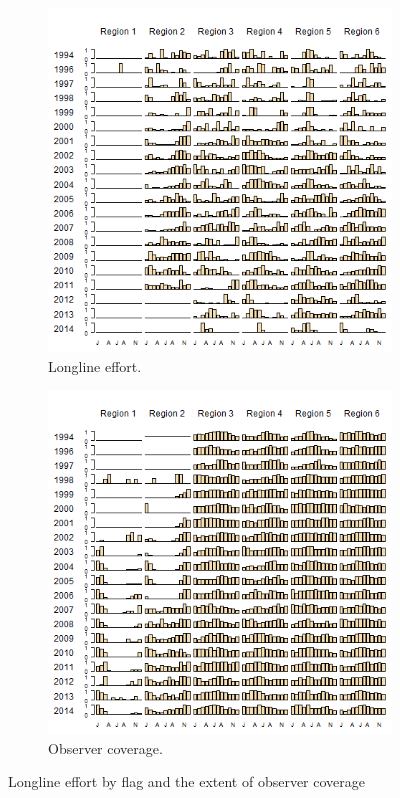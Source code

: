 \documentclass[12pt]{SCreport}
\begin{document}
\begin{landscape}
\begin{figure}
\centering
   \begin{subfigure}[b]{0.6\textwidth}
       \includegraphics[width=\textwidth]{../GRAPHICS/Defined/FIG_06a_obsBY_mm_RDS}
       \caption{Longline effort.}
       \label{fig:test1}
   \end{subfigure}
   \begin{subfigure}[b]{0.6\textwidth}
       \includegraphics[width=\textwidth]{../GRAPHICS/Defined/FIG_06b_LOGSHEET_mm_RDS}
       \caption{Observer coverage.}
       \label{fig:test2}
   \end{subfigure}
\caption{Longline effort by flag and the extent of observer coverage}
\label{fig:fig06} 
\end{figure}
\end{landscape}
\end{document}
